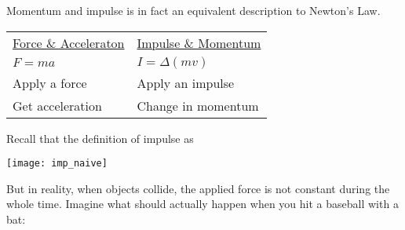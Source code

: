 \documentclass[class=article, crop=false, 12pt]{standalone}
\begin{document}
Momentum and impulse is in fact an equivalent description to Newton's  Law.

\begin{center}
    \begin{tabular}{ >{\centering\arraybackslash}m{15em} | >{\centering\arraybackslash}m{15em} }
        \ul{Force \& Acceleraton} & \ul{Impulse \& Momentum} \\ 
        $F=ma$ & $I=\Delta(mv)$ \\  
        Apply a force & Apply an impulse \\
        Get acceleration & Change in momentum    
    \end{tabular}
\end{center}


Recall that the definition of impulse as \\[-2.5em]
\begin{center}
    \begin{minipage}{0.5\textwidth}
    \end{minipage}
    \hspace{0.05\textwidth}
    \begin{minipage}{0.35\textwidth}
        \centering
        \texttt{[image: imp\_naive]}
    \end{minipage}
    \hfill
\end{center}

But in reality, when objects collide, the applied force is not constant during the whole time.
Imagine what should actually happen when you hit a baseball with a bat:
\end{document}
